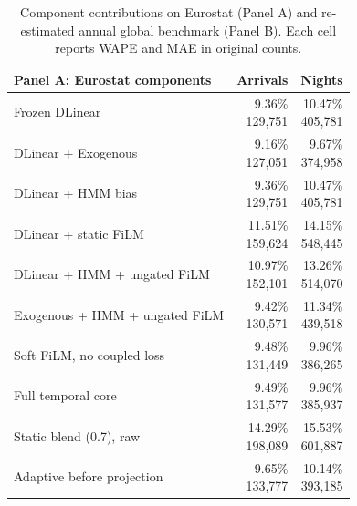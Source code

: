\begin{table}[!t]
\centering
\caption{Component contributions on Eurostat (Panel A) and re-estimated annual global benchmark (Panel B). Each cell reports WAPE and MAE in original counts.}
\label{tab:section4_components_global}
\footnotesize
\setlength{\tabcolsep}{3pt}
\renewcommand{\arraystretch}{1.10}
\begin{minipage}[t]{0.49\textwidth}
\centering
\begin{tabular}[t]{@{}lrr@{}}
\toprule
\textbf{Panel A: Eurostat components} & \textbf{Arrivals} & \textbf{Nights} \\
\midrule
Frozen DLinear & \shortstack{9.36\%\\129,751} & \shortstack{10.47\%\\405,781} \\
DLinear + Exogenous & \shortstack{9.16\%\\127,051} & \shortstack{9.67\%\\374,958} \\
DLinear + HMM bias & \shortstack{9.36\%\\129,751} & \shortstack{10.47\%\\405,781} \\
DLinear + static FiLM & \shortstack{11.51\%\\159,624} & \shortstack{14.15\%\\548,445} \\
DLinear + HMM + ungated FiLM & \shortstack{10.97\%\\152,101} & \shortstack{13.26\%\\514,070} \\
Exogenous + HMM + ungated FiLM & \shortstack{9.42\%\\130,571} & \shortstack{11.34\%\\439,518} \\
Soft FiLM, no coupled loss & \shortstack{9.48\%\\131,449} & \shortstack{9.96\%\\386,265} \\
Full temporal core & \shortstack{9.49\%\\131,577} & \shortstack{9.96\%\\385,937} \\
Static blend (0.7), raw & \shortstack{14.29\%\\198,089} & \shortstack{15.53\%\\601,887} \\
Adaptive before projection & \shortstack{9.65\%\\133,777} & \shortstack{10.14\%\\393,185} \\

\end{tabular}
\end{minipage}
\end{table}
